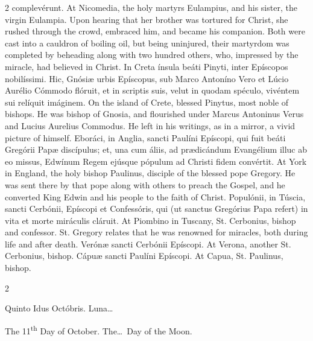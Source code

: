 \begin{paracol}{2}
 complevérunt.
\switchcolumn
{}
At Nicomedia, the holy martyrs 
 Eulampius, and his sister, the virgin Eulampia. Upon hearing that her 
 brother was tortured for Christ, she rushed through the crowd, embraced him, 
 and became his companion. Both were cast into a cauldron of boiling 
 oil, but being uninjured, their martyrdom was completed by beheading along 
 with two hundred others, who, impressed by the miracle, had believed in 
 Christ.
\switchcolumn*
{}
In Creta ínsula beáti 
 Pinyti, inter Epíscopos nobilíssimi. Hic, Gnósiæ urbis Epíscopus, sub 
 Marco Antoníno Vero et Lúcio Aurélio Cómmodo flóruit, et in scriptis suis, 
 velut in quodam spéculo, vivéntem sui relíquit imáginem.
\switchcolumn
{}
On the island of Crete, blessed 
 Pinytus, most noble of bishops. He was bishop of Gnosia, and 
 flourished under Marcus Antoninus Verus and Lucius Aurelius Commodus. 
 He left in his writings, as in a mirror, a vivid picture of himself.
\switchcolumn*
{}
Eboráci, in Anglia, 
 sancti Paulíni Epíscopi, qui fuit beáti Gregórii Papæ discípulus; et, una 
 cum áliis, ad prædicándum Evangélium illuc ab eo missus, Edwínum Regem 
 ejúsque pópulum ad Christi fidem convértit.
\switchcolumn
{}
At York in England, the holy bishop 
 Paulinus, disciple of the blessed pope Gregory. He was sent there by 
 that pope along with others to preach the Gospel, and he converted King 
 Edwin and his people to the faith of Christ.
\switchcolumn*
{}
Populónii, in Túscia, 
 sancti Cerbónii, Epíscopi et Confessóris, qui (ut sanctus Gregórius Papa 
 refert) in vita et morte miráculis cláruit.
\switchcolumn
{}
At Piombino in Tuscany, St. 
 Cerbonius, bishop and confessor. St. Gregory relates that he was 
 renowned for miracles, both during life and after death.
\switchcolumn*
{}
Verónæ sancti Cerbónii 
 Epíscopi.
\switchcolumn
{}
At Verona, another St. Cerbonius, 
 bishop.
\switchcolumn*
{}
Cápuæ sancti Paulíni 
 Epíscopi.
\switchcolumn
{}
At Capua, St. Paulinus, bishop.
\switchcolumn*
{}
\end{paracol}


\begin{paracol}{2}
\begin{center}{\color{gregoriocolor} Quinto Idus Octóbris. 
 Luna\dots\ }\end{center}
\switchcolumn
{}
\begin{center}{\color{gregoriocolor} The   11\textsuperscript{th} Day of 
 October. The\dots\ Day of the Moon.}\end{center}
\end{paracol}

